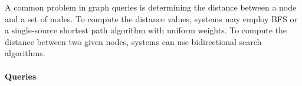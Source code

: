 
A common problem in graph queries is determining the distance between a node and
a set of nodes. To compute the distance values, systems may employ BFS or a
single-source shortest path algorithm with uniform weights. To compute the
distance between two given nodes, systems can use bidirectional search
algorithms.


\paragraph{Queries}
{\raggedright
}